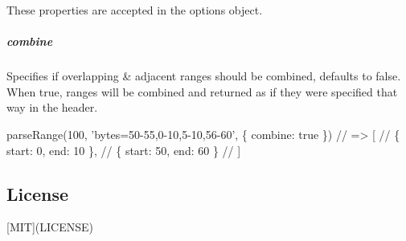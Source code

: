 These properties are accepted in the options object.

\subparagraph*{combine}

Specifies if overlapping \& adjacent ranges should be combined, defaults to {\ttfamily false}. When {\ttfamily true}, ranges will be combined and returned as if they were specified that way in the header.


\begin{DoxyCode}
parseRange(100, 'bytes=50-55,0-10,5-10,56-60', \{ combine: true \})
// => [
//      \{ start: 0,  end: 10 \},
//      \{ start: 50, end: 60 \}
//    ]
\end{DoxyCode}


\subsection*{License}

\mbox{[}M\+IT\mbox{]}(L\+I\+C\+E\+N\+SE) 